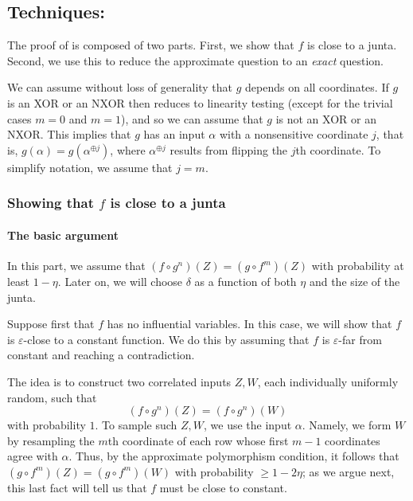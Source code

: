 \documentclass{article}
\theoremstyle{definition}
\theoremstyle{remark}
\newcommand\eps{\varepsilon}
\renewcommand\epsilon{\eps}
\renewcommand\geq{\geqslant}
\begin{document}
\subsection{Techniques: }

The proof of  is composed of two parts. First, we show that $f$ is close to a junta. Second, we use this to reduce the approximate question to an \emph{exact} question.

We can assume without loss of generality that $g$ depends on all coordinates. If $g$ is an XOR or an NXOR then  reduces to linearity testing (except for the trivial cases $m = 0$ and $m = 1$), and so we can assume that $g$ is not an XOR or an NXOR. This implies that $g$ has an input $\alpha$ with a nonsensitive coordinate $j$, that is, $g(\alpha) = g(\alpha^{\oplus j})$, where $\alpha^{\oplus j}$ results from flipping the $j$th coordinate. To simplify notation, we assume that $j = m$.

\subsubsection{Showing that \texorpdfstring{$f$}{f} is close to a junta}
\paragraph{The basic argument}
In this part, we assume that $(f \circ g^{n})(Z) = (g \circ f^{m})(Z)$ with probability at least $1 - \eta$. Later on, we will choose $\delta$ as a function of both $\eta$ and the size of the junta.

Suppose first that $f$ has no influential variables. In this case, we will show that $f$ is $\epsilon$-close to a constant function. We do this by assuming that $f$ is $\epsilon$-far from constant and reaching a contradiction.

The idea is to construct two correlated inputs $Z,W$, each individually uniformly random, such that
\[
 (f \circ g^{n})(Z) = (f \circ g^{n})(W)
\]
with probability $1$. To sample such $Z,W$, we use the input $\alpha$. Namely, we form $W$ by resampling the $m$th coordinate of each row whose first $m-1$ coordinates agree with $\alpha$. Thus, by the approximate polymorphism condition, it follows 
that $(g\circ f^{m})(Z) = (g\circ f^{m})(W)$ with probability $\geq 1-2\eta$; as we argue next, this last fact will tell us that $f$ must be close to constant.
\end{document}
